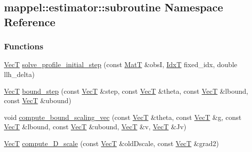 \hypertarget{namespacemappel_1_1estimator_1_1subroutine}{}\subsection{mappel\+:\+:estimator\+:\+:subroutine Namespace Reference}
\label{namespacemappel_1_1estimator_1_1subroutine}
\subsubsection*{Functions}
\begin{DoxyCompactItemize}
\item 
\hyperlink{namespacemappel_a2225ad69f358daa3f4f99282a35b9a3a}{VecT} \hyperlink{namespacemappel_1_1estimator_1_1subroutine_a002586a416b03776ab8d2d3e846370c7}{solve\+\_\+profile\+\_\+initial\+\_\+step} (const \hyperlink{namespacemappel_a7091ab87c528041f7e2027195fad8915}{MatT} \&obsI, \hyperlink{namespacemappel_ab17ec0f30b61ece292439d7ece81d3a8}{IdxT} fixed\+\_\+idx, double llh\+\_\+delta)
\item 
\hyperlink{namespacemappel_a2225ad69f358daa3f4f99282a35b9a3a}{VecT} \hyperlink{namespacemappel_1_1estimator_1_1subroutine_abc13a3e704d5a6b0f061b0b16c2d7f2c}{bound\+\_\+step} (const \hyperlink{namespacemappel_a2225ad69f358daa3f4f99282a35b9a3a}{VecT} \&step, const \hyperlink{namespacemappel_a2225ad69f358daa3f4f99282a35b9a3a}{VecT} \&theta, const \hyperlink{namespacemappel_a2225ad69f358daa3f4f99282a35b9a3a}{VecT} \&lbound, const \hyperlink{namespacemappel_a2225ad69f358daa3f4f99282a35b9a3a}{VecT} \&ubound)
\item 
void \hyperlink{namespacemappel_1_1estimator_1_1subroutine_a1673ca9f6b96264e3919797433c36c9e}{compute\+\_\+bound\+\_\+scaling\+\_\+vec} (const \hyperlink{namespacemappel_a2225ad69f358daa3f4f99282a35b9a3a}{VecT} \&theta, const \hyperlink{namespacemappel_a2225ad69f358daa3f4f99282a35b9a3a}{VecT} \&g, const \hyperlink{namespacemappel_a2225ad69f358daa3f4f99282a35b9a3a}{VecT} \&lbound, const \hyperlink{namespacemappel_a2225ad69f358daa3f4f99282a35b9a3a}{VecT} \&ubound, \hyperlink{namespacemappel_a2225ad69f358daa3f4f99282a35b9a3a}{VecT} \&v, \hyperlink{namespacemappel_a2225ad69f358daa3f4f99282a35b9a3a}{VecT} \&Jv)
\item 
\hyperlink{namespacemappel_a2225ad69f358daa3f4f99282a35b9a3a}{VecT} \hyperlink{namespacemappel_1_1estimator_1_1subroutine_a182a266dac3ad7cd931263861b36d00e}{compute\+\_\+\+D\+\_\+scale} (const \hyperlink{namespacemappel_a2225ad69f358daa3f4f99282a35b9a3a}{VecT} \&old\+Dscale, const \hyperlink{namespacemappel_a2225ad69f358daa3f4f99282a35b9a3a}{VecT} \&grad2)

\end{DoxyCompactItemize}
